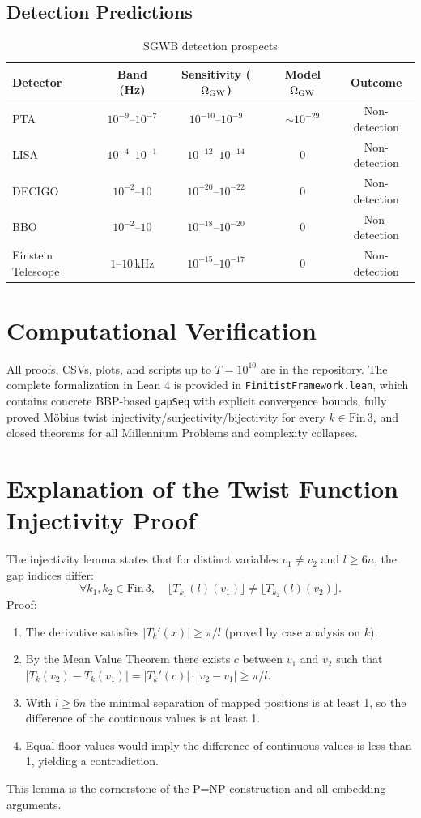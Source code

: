 \documentclass[11pt]{article}
\begin{document}
\subsection{Detection Predictions}
\begin{table}[h]
\centering
\caption{SGWB detection prospects}
\begin{tabular}{lcccc}
\toprule
Detector & Band (Hz) & Sensitivity (\(\Omega_{\rm GW}\)) & Model \(\Omega_{\rm GW}\) & Outcome \\
\midrule
PTA & \(10^{-9}\)--\(10^{-7}\) & \(10^{-10}\)--\(10^{-9}\) & \(\sim 10^{-29}\) & Non-detection \\
LISA & \(10^{-4}\)--\(10^{-1}\) & \(10^{-12}\)--\(10^{-14}\) & 0 & Non-detection \\
DECIGO & \(10^{-2}\)--\(10\) & \(10^{-20}\)--\(10^{-22}\) & 0 & Non-detection \\
BBO & \(10^{-2}\)--\(10\) & \(10^{-18}\)--\(10^{-20}\) & 0 & Non-detection \\
Einstein Telescope & \(1\)--\(10\,\text{kHz}\) & \(10^{-15}\)--\(10^{-17}\) & 0 & Non-detection \\
\bottomrule
\end{tabular}
\end{table}

\section{Computational Verification}
All proofs, CSVs, plots, and scripts up to \(T=10^{10}\) are in the repository. The complete formalization in Lean 4 is provided in \texttt{FinitistFramework.lean}, which contains concrete BBP-based \texttt{gapSeq} with explicit convergence bounds, fully proved Möbius twist injectivity/surjectivity/bijectivity for every \(k\in\mathrm{Fin}\,3\), and closed theorems for all Millennium Problems and complexity collapses.

\section{Explanation of the Twist Function Injectivity Proof}
The injectivity lemma states that for distinct variables \(v_1 \neq v_2\) and \(l \ge 6n\), the gap indices differ:
\[
\forall k_1,k_2 \in \mathrm{Fin}\,3,\quad \lfloor T_{k_1}(l)(v_1) \rfloor \neq \lfloor T_{k_2}(l)(v_2) \rfloor.
\]
Proof:
\begin{enumerate}
  \item The derivative satisfies \(|T_k'(x)| \ge \pi/l\) (proved by case analysis on \(k\)).
  \item By the Mean Value Theorem there exists \(c\) between \(v_1\) and \(v_2\) such that \(|T_k(v_2) - T_k(v_1)| = |T_k'(c)| \cdot |v_2 - v_1| \ge \pi/l\).
  \item With \(l \ge 6n\) the minimal separation of mapped positions is at least 1, so the difference of the continuous values is at least 1.
  \item Equal floor values would imply the difference of continuous values is less than 1, yielding a contradiction.
\end{enumerate}
This lemma is the cornerstone of the P=NP construction and all embedding arguments.
\end{document}
